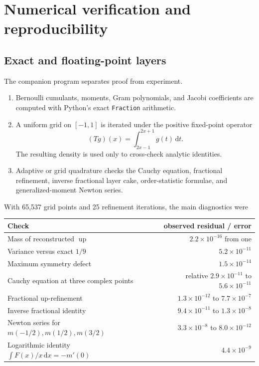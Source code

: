 \documentclass[11pt,oneside]{article}
\numberwithin{equation}{section}
\theoremstyle{definition}
\theoremstyle{remark}
\newcommand{\Up}{\operatorname{up}}
\newcommand{\dd}{\,\mathrm d}
\begin{document}
\section{Numerical verification and reproducibility}
\label{sec:numerics}

\subsection{Exact and floating-point layers}

The companion program  separates proof from
experiment.
\begin{enumerate}
\item Bernoulli cumulants, moments, Gram polynomials, and Jacobi coefficients
      are computed with Python's exact \texttt{Fraction} arithmetic.
\item A uniform grid on \([-1,1]\) is iterated under the positive fixed-point
      operator
      \[
        (Tg)(x)=\int_{2x-1}^{2x+1}g(t)\dd t.
      \]
      The resulting density is used only to cross-check analytic identities.
\item Adaptive or grid quadrature checks the Cauchy equation, fractional
      refinement, inverse fractional layer cake, order-statistic formulae, and
      generalized-moment Newton series.
\end{enumerate}

With 65,537 grid points and 25 refinement iterations, the main diagnostics were
\begin{center}
\small
\begin{tabularx}{0.95\textwidth}{@{}Xr@{}}
\toprule
Check & observed residual / error \\
\midrule
Mass of reconstructed \(\Up\) & \(2.2\times10^{-16}\) from one \\
Variance versus exact \(1/9\) & \(5.2\times10^{-11}\) \\
Maximum symmetry defect & \(1.5\times10^{-14}\) \\
Cauchy equation at three complex points & relative \(2.9\times10^{-11}\) to \(5.6\times10^{-11}\) \\
Fractional up-refinement & \(1.3\times10^{-12}\) to \(7.7\times10^{-7}\) \\
Inverse fractional identity & \(9.4\times10^{-11}\) to \(1.3\times10^{-8}\) \\
Newton series for \(m(-1/2),m(1/2),m(3/2)\) & \(3.3\times10^{-8}\) to \(8.0\times10^{-12}\) \\
Logarithmic identity \(\int F(x)/x\dd x=-m'(0)\) & \(4.4\times10^{-9}\) \\
\bottomrule
\end{tabularx}
\end{center}
\end{document}
